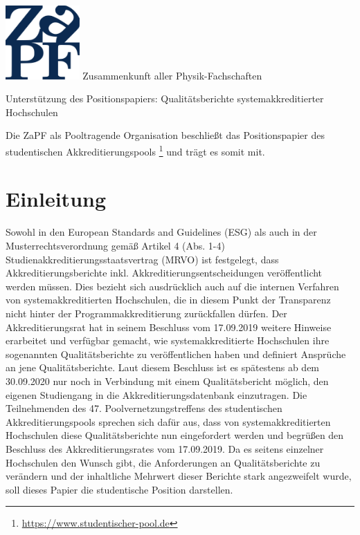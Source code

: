 \documentclass[DIV=calc]{scrartcl}
\begin{document}
  \hspace{0.87\textwidth}
  \begin{minipage}{120pt}
  	\vspace{-1.8cm}
  	\includegraphics[width=80pt]{../logo.pdf}
  	\centering
  	\small Zusammenkunft aller Physik-Fachschaften
  \end{minipage}
  \begin{center}
    \huge{Unterstützung des Positionspapiers: Qualitätsberichte systemakkreditierter Hochschulen}\vspace{.25\baselineskip}\\
  	\normalsize
  \end{center}
  \vspace{1cm}


Die ZaPF als Pooltragende Organisation beschließt das Positionspapier des studentischen Akkreditierungspools
\footnote{\url{https://www.studentischer-pool.de}} und trägt es somit mit. \\

\section*{Einleitung}
Sowohl in den European Standards and Guidelines (ESG) als auch in der Musterrechtsverordnung gemäß Artikel 4 (Abs. 1-4) Studienakkreditierungsstaatsvertrag (MRVO) ist festgelegt, 
dass Akkreditierungsberichte inkl. Akkreditierungsentscheidungen veröffentlicht werden müssen. 
Dies bezieht sich ausdrücklich auch auf die internen Verfahren von systemakkreditierten Hochschulen, die in diesem Punkt der Transparenz nicht hinter der Programmakkreditierung zurückfallen dürfen. 
Der Akkreditierungsrat hat in seinem Beschluss vom 17.09.2019 weitere Hinweise erarbeitet und verfügbar gemacht, wie systemakkreditierte Hochschulen ihre sogenannten  Qualitätsberichte zu veröffentlichen haben und definiert Ansprüche an jene Qualitätsberichte. 
Laut diesem Beschluss ist es spätestens ab dem 30.09.2020 nur noch in Verbindung mit einem Qualitätsbericht möglich, den eigenen Studiengang in die Akkreditierungsdatenbank einzutragen.
Die Teilnehmenden des 47. Poolvernetzungstreffens des studentischen Akkreditierungspools sprechen sich dafür aus, dass von systemakkreditierten Hochschulen diese Qualitätsberichte nun eingefordert werden und begrüßen den Beschluss des Akkreditierungsrates vom 17.09.2019. 
Da es seitens einzelner Hochschulen den Wunsch gibt, die Anforderungen an Qualitätsberichte zu verändern und der inhaltliche Mehrwert dieser Berichte stark angezweifelt wurde, soll dieses Papier die studentische Position darstellen. 
\end{document}
